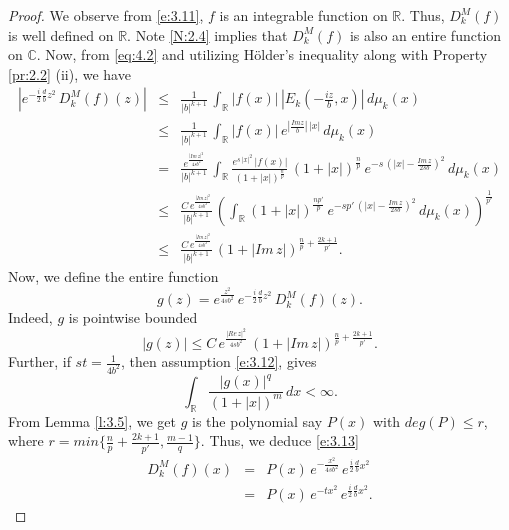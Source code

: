 \documentclass[12pt,a4paper,reqno]{amsproc}
\theoremstyle{definition}
\theoremstyle{remark}
\numberwithin{equation}{section}
\begin{document}
\begin{proof}
We observe from \eqref{e:3.11}, $f$ is an  integrable function on $\mathbb{R}
$. Thus, $D_k^M(f)$ is well defined on $\mathbb{R}$. Note \ref{N:2.4} implies that  $D_k^M(f)$ is also an entire function on $\mathbb{C}$. 
Now, from \eqref{eq:4.2} and utilizing  H\"older's inequality along with Property \ref{pr:2.2} (ii), we have
\begin{eqnarray*}
|e^{-\frac{i}{2}\frac{d}{b}z^2}\,D_k^M(f)(z)| &\le& \frac{1}{|b|^{k+1}}\, \int_{\mathbb{R}} |f(x)|\, \left|E_k\left(-\frac{iz}{b},x\right)\right|\, d\mu_k(x)\\
&\le& \frac{1}{|b|^{k+1}}\, \int_{\mathbb{R}} |f(x)|\, e^{|\frac{Im z}{b}|\,|x|}\,d\mu_k(x)\\
&=& \frac{e^{\frac{|Im\,z|^2}{4sb^2}}}{|b|^{k+1}}\, \int_{\mathbb{R}} \frac{e^{s\,|x|^2}\,|f(x)|}{(1+|x|)^{\frac{n}{p}}}\, (1+|x|)^{\frac{n}{p}}\, e^{-s\,\left(|x|-\frac{Im\, z}{ 2sb}\right)^2}\,d\mu_k(x)\\
&\le& \frac{ C\,e^{\frac{|Im\,z|^2}{4sb^2}}}{|b|^{k+1}}\, \left(\int_{\mathbb{R}} (1+|x|)^{\frac{np'}{p}}\, e^{-sp'\,\left(|x|- \frac{Im\, z}{ 2sb}\right)^2}\,d\mu_k(x)\right)^{\frac{1}{p'}}\\ 
&\le& \frac{ C\,e^{\frac{|Im\,z|^2}{4sb^2}}}{|b|^{k+1}}\,\left(1+|Im\,z| \right)^{\frac{n}{p}+\frac{2k+1}{p'}}.
\end{eqnarray*} 
Now, we define the entire function 
\begin{equation} \label{e:3.13}
g(z) = e^{\frac{z^2}{4sb^2}}\, e^{-\frac{i}{2}\frac{d}{b}z^2}\, D_k^M(f)(z).
\end{equation} 
 Indeed, $g$ is pointwise bounded 
\begin{equation*}
|g(z)| \le   C\,e^{\frac{|Re\,z|^2}{4sb^2}}\,\left(1+|Im\,z| \right)^{\frac{n}{p}+\frac{2k+1}{p'}}.
\end{equation*}
Further, if $st= \frac{1}{4b^2}$, then assumption \eqref{e:3.12}, gives 
\begin{equation*}
    \int_{\mathbb{R}} \frac{ |g(x)|^q}{(1+|x|)^m}\,dx <\infty.  
\end{equation*}
From Lemma \ref{l:3.5}, we get $g$ is the polynomial  say $P(x)$ with $deg (P) \le r $, where $r=min \{\frac{n}{p}+\frac{2k+1}{p'}, \frac{m-1}{q}\}$. Thus, we deduce \eqref{e:3.13} 
\begin{eqnarray*}
D_k^M(f)(x) &=& P(x)\,e^{-\frac{x^2}{4sb^2}}\, e^{\frac{i}{2}\frac{d}{b}x^2} \\ 
&=&P(x)\,e^{-tx^2}\, e^{\frac{i}{2}\frac{d}{b}x^2}. 
\end{eqnarray*}

\end{proof}
\end{document}
